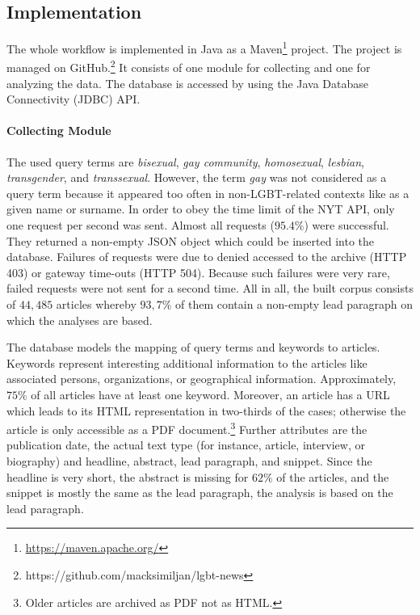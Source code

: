 \documentclass[10pt,a4paper,twocolumn]{scrartcl}
\begin{document}
\subsection*{Implementation} The whole workflow is implemented in Java as a Maven\footnote{\url{https://maven.apache.org/}} project. The project is managed on GitHub.\footnote{https://github.com/macksimiljan/lgbt-news} It consists of one module for collecting and one for analyzing the data. The database is accessed by using the Java Database Connectivity (JDBC) API.

\paragraph*{Collecting Module} The used query terms are \textit{bisexual}, \textit{gay community}, \textit{homosexual}, \textit{lesbian}, \textit{transgender}, and \textit{transsexual}. However, the term \textit{gay} was not considered as a query term because it appeared too often in non-LGBT-related contexts like as a given name or surname. In order to obey the time limit of the NYT API, only one request per second was sent. Almost all requests ($95.4\%$) were successful. They returned a non-empty JSON object which could be inserted into the database. Failures of requests were due to denied accessed to the archive (HTTP 403) or gateway time-outs (HTTP 504). Because such failures were very rare, failed requests were not sent for a second time. All in all, the built corpus consists of $44,485$ articles whereby $93,7\%$ of them contain a non-empty lead paragraph on which the analyses are based.

The database models the mapping of query terms and keywords to articles. Keywords represent interesting additional information to the articles like associated persons, organizations, or geographical information. Approximately, $75\%$ of all articles have at least one keyword. Moreover, an article has a URL which leads to its HTML representation in two-thirds of the cases; otherwise the article is only accessible as a PDF document.\footnote{Older articles are archived as PDF not as HTML.} Further attributes are the publication date, the actual text type (for instance, article, interview, or biography) and headline, abstract, lead paragraph, and snippet. Since the headline is very short, the abstract is missing for $62\%$ of the articles, and the snippet is mostly the same as the lead paragraph, the analysis is based on the lead paragraph.
\end{document}
